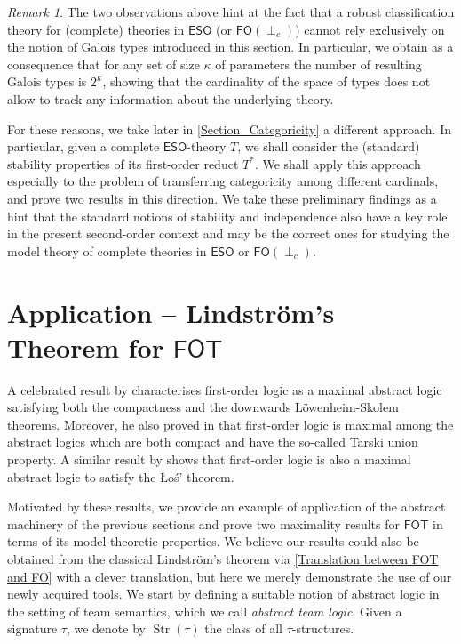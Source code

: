 \documentclass[a4paper]{amsart}
\theoremstyle{definition}
\theoremstyle{remark}
\newtheorem*{remark}{Remark}
\newcommand\fot{\mathsf{FOT}}
\newcommand\eso{\mathsf{ESO}}
\newcommand\foil{\mathsf{FO}(\perp_c)}
\theoremstyle{definition}
\DeclareMathOperator{\Str}{Str}
\begin{document}
\begin{remark}
    The two observations above hint at the fact that a robust classification theory for (complete) theories in $\eso$ (or $\foil$) cannot rely exclusively on the notion of Galois types introduced in this section. In particular, we obtain as a consequence that for any set of size $\kappa$ of parameters the number of resulting Galois types is $2^\kappa$, showing that the cardinality of the space of types does not allow to track any information about the underlying theory. 
        
    For these reasons, we take later  in \cref{Section_Categoricity} a different approach. In particular, given a complete $\eso$-theory $T$, we shall consider the (standard) stability properties of its first-order reduct $T^*$. We shall apply this approach especially to the problem of transferring categoricity among different cardinals, and prove two results in this direction. We take these preliminary findings as a hint that the standard notions of stability and independence also have a key role in the present second-order context and may be the correct ones for studying the model theory of complete theories in $\eso$ or $\foil$.
\end{remark}




\section{Application -- Lindström's Theorem for $\fot$}\label{Lindstrom}

A celebrated result by \textcite{lindstrom1969extensions} characterises first-order logic as a maximal abstract logic satisfying both the compactness and the downwards Löwenheim-Skolem theorems. Moreover, he also proved in \cite{lindstrom1974characterizing} that first-order logic is maximal among the abstract logics which are both compact and have the so-called Tarski union property. A similar result by \textcite{sgro1977maximal} shows that first-order logic is also a maximal abstract logic to satisfy the Łoś' theorem.

Motivated by these results, we provide an example of application of the abstract machinery of the previous sections and prove two maximality results for $\fot$ in terms of its model-theoretic properties. We believe our results could also be obtained from the classical Lindström's theorem via \cref{Translation between FOT and FO} with a clever translation, but here we merely demonstrate the use of our newly acquired tools. We start by defining a suitable notion of abstract logic in the setting of team semantics, which we call \emph{abstract team logic}.  Given a signature $\tau$, we denote by $\Str(\tau)$ the class of all $\tau$-structures.
\end{document}
